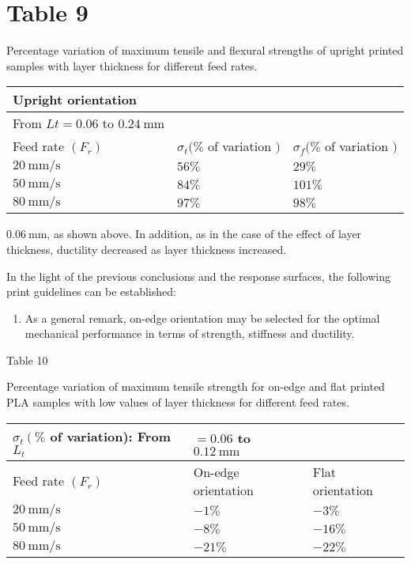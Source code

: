 \documentclass[10pt]{article}
\begin{document}
\section*{Table 9}
Percentage variation of maximum tensile and flexural strengths of upright printed samples with layer thickness for different feed rates.

\begin{center}
\begin{tabular}{lll}
\hline
Upright orientation &  &  \\
\hline
From $L t=0.06$ to $0.24 \mathrm{~mm}$ &  &  \\
\hline
Feed rate $\left(F_{r}\right)$ & $\sigma_{t}(\%$ of variation $)$ & $\sigma_{f}(\%$ of variation $)$ \\
\hline
$20 \mathrm{~mm} / \mathrm{s}$ & $56 \%$ & $29 \%$ \\
$50 \mathrm{~mm} / \mathrm{s}$ & $84 \%$ & $101 \%$ \\
$80 \mathrm{~mm} / \mathrm{s}$ & $97 \%$ & $98 \%$ \\
\hline
\end{tabular}
\end{center}

$0.06 \mathrm{~mm}$, as shown above. In addition, as in the case of the effect of layer thickness, ductility decreased as layer thickness increased.

In the light of the previous conclusions and the response surfaces, the following print guidelines can be established:

\begin{enumerate}
  \item As a general remark, on-edge orientation may be selected for the optimal mechanical performance in terms of strength, stiffness and ductility.
\end{enumerate}

Table 10

Percentage variation of maximum tensile strength for on-edge and flat printed PLA samples with low values of layer thickness for different feed rates.

\begin{center}
\begin{tabular}{lll}
\hline
$\sigma_{t}\left(\%\right.$ of variation): From $L_{t}$ & $=0.06$ to $0.12 \mathrm{~mm}$ &  \\
\hline
Feed rate $\left(F_{r}\right)$ & On-edge orientation & Flat orientation \\
\hline
$20 \mathrm{~mm} / \mathrm{s}$ & $-1 \%$ & $-3 \%$ \\
$50 \mathrm{~mm} / \mathrm{s}$ & $-8 \%$ & $-16 \%$ \\
$80 \mathrm{~mm} / \mathrm{s}$ & $-21 \%$ & $-22 \%$ \\
\hline
\end{tabular}
\end{center}
\end{document}
